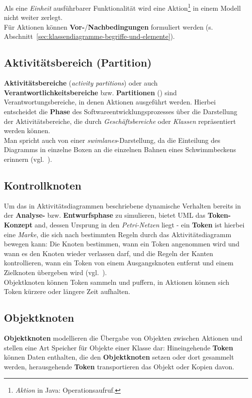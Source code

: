\noindent
Als eine \textit{Einheit} ausführbarer Funktionalität wird eine Aktion\footnote{
\textit{Aktion} in Java: Operationsaufruf.
} in einem Modell nicht weiter zerlegt.\\
Für Aktionen können \textbf{Vor-}/\textbf{Nachbedingungen} formuliert werden (s. Abschnitt~\ref{sec:klassendiagramme-begriffe-und-elemente}).

\subsection{Aktivitätsbereich (Partition)}
\textbf{Aktivitätsbereiche} (\textit{activity partitions}) oder auch \textbf{Verantwortlichkeitsbereiche} bzw. \textbf{Partitionen} (\cite[76]{Bal05}) sind Verantwortungsbereiche, in denen Aktionen ausgeführt werden.
Hierbei entscheidet die \textbf{Phase} des Softwareentwicklungsprozesses über die Darstellung der Aktivitätsbereiche, die durch \textit{Geschäftsbereiche} oder \textit{Klassen} repräsentiert werden können.\\
Man spricht auch von einer \textit{swimlanes}-Darstellung, da die Einteilung des Diagramms in einzelne Boxen an die einzelnen Bahnen eines Schwimmbeckens erinnern (vgl.~\cite[76]{Bal05}).

\subsection{Kontrollknoten}
Um das in Aktivitätsdiagrammen beschriebene dynamische Verhalten bereits in der \textbf{Analyse-} bzw. \textbf{Entwurfsphase} zu simulieren, bietet UML das \textbf{Token-Konzept} and, dessen Ursprung in den \textit{Petri-Netzen} liegt - ein \textbf{Token} ist hierbei eine \textit{Marke}, die sich nach bestimmten Regeln durch das Aktivitätsdiagramm bewegen kann: Die Knoten bestimmen, wann ein Token angenommen wird und wann es den Knoten wieder verlassen darf, und die Regeln der Kanten kontrollieren, wann ein Token von einem Ausgangsknoten entfernt und einem Zielknoten übergeben wird (vgl.~\cite[323]{Bal05}).\\
Objektknoten können Token sammeln und puffern, in Aktionen können sich Token kürzere oder längere Zeit aufhalten.\\

\subsection{Objektknoten}


\textbf{Objektknoten} modellieren die Übergabe von Objekten zwischen Aktionen und stellen eine Art Speicher für Objekte einer Klasse dar: Hineingehende \textbf{Token} können Daten enthalten, die den \textbf{Objektknoten} setzen oder dort gesammelt werden, herausgehende \textbf{Token} transportieren das Objekt oder Kopien davon.\\

